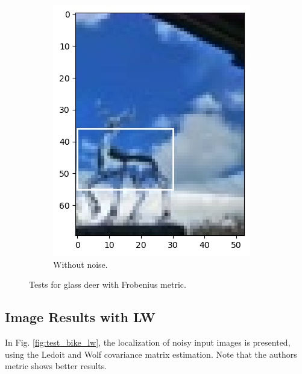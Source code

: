 \documentclass[11pt]{article}
\theoremstyle{definition}
\theoremstyle{remark}
\theoremstyle{remark}
\theoremstyle{remark}
\begin{document}
\begin{figure}[H]
\begin{subfigure}[b]{0.32\textwidth}
    \centering \includegraphics[width=\textwidth]{figs/1-3-1-test_case3.jpg}
    \caption{Without noise.}
  \end{subfigure}
  \caption{Tests for glass deer with Frobenius metric.}
  \label{fig:test_deer_fro}
\end{figure}

\subsection{Image Results with LW}
In Fig. \ref{fig:test_bike_lw}, the localization of noisy input images is
presented, using the Ledoit and Wolf covariance matrix estimation. Note that the
authors metric shows better results.
\end{document}
